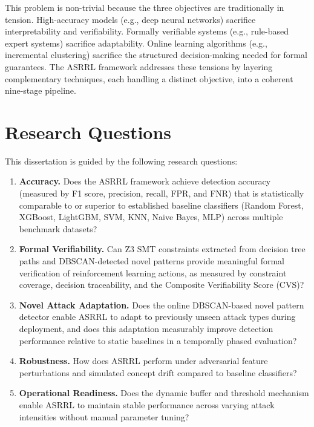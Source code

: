 \documentclass[12pt, letterpaper, oneside]{report}
\newcommand{\ASRRL}{\textsc{ASRRL}}
\begin{document}
This problem is non-trivial because the three objectives are traditionally in tension. High-accuracy models (e.g., deep neural networks) sacrifice interpretability and verifiability. Formally verifiable systems (e.g., rule-based expert systems) sacrifice adaptability. Online learning algorithms (e.g., incremental clustering) sacrifice the structured decision-making needed for formal guarantees. The \ASRRL{} framework addresses these tensions by layering complementary techniques, each handling a distinct objective, into a coherent nine-stage pipeline.


\section{Research Questions}
\label{sec:research_questions}

This dissertation is guided by the following research questions:

\begin{enumerate}[label=\textbf{RQ\arabic*.}]
    \item \textbf{Accuracy.} Does the \ASRRL{} framework achieve detection accuracy (measured by F1 score, precision, recall, FPR, and FNR) that is statistically comparable to or superior to established baseline classifiers (Random Forest, XGBoost, LightGBM, SVM, KNN, Naive Bayes, MLP) across multiple benchmark datasets?

    \item \textbf{Formal Verifiability.} Can Z3 SMT constraints extracted from decision tree paths and DBSCAN-detected novel patterns provide meaningful formal verification of reinforcement learning actions, as measured by constraint coverage, decision traceability, and the Composite Verifiability Score (CVS)?

    \item \textbf{Novel Attack Adaptation.} Does the online DBSCAN-based novel pattern detector enable \ASRRL{} to adapt to previously unseen attack types during deployment, and does this adaptation measurably improve detection performance relative to static baselines in a temporally phased evaluation?

    \item \textbf{Robustness.} How does \ASRRL{} perform under adversarial feature perturbations and simulated concept drift compared to baseline classifiers?

    \item \textbf{Operational Readiness.} Does the dynamic buffer and threshold mechanism enable \ASRRL{} to maintain stable performance across varying attack intensities without manual parameter tuning?
\end{enumerate}
\end{document}
